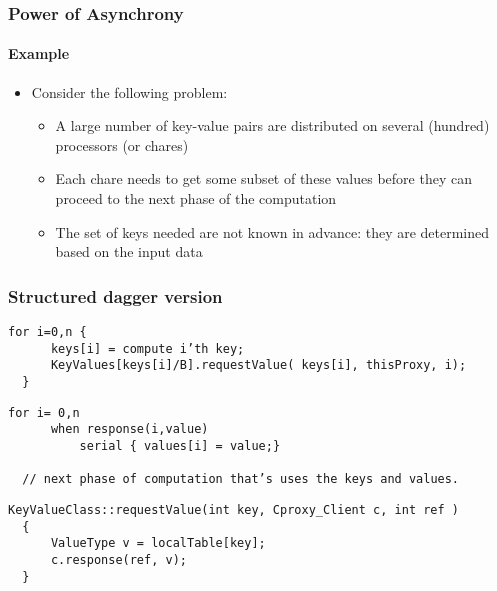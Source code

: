 \begin{frame}[fragile]

  \frametitle{Power of Asynchrony}
  \framesubtitle{Example}

  \begin{itemize}
    \item Consider the following problem:
    \begin{itemize}
      \item A large number of key-value pairs are distributed on several (hundred) processors  (or chares)
      \pause
      \item Each chare needs to get some subset of these values before they can proceed to the next phase of the computation
      \pause 
      \item The set of keys needed are not known in advance: they are determined based on the input data
    \end{itemize}
  \end{itemize}
\end{frame}

\begin{frame}[fragile]
  \frametitle{Structured dagger version}
  \begin{lstlisting}[basicstyle=\footnotesize]
  for i=0,n {
      keys[i] = compute i’th key;
      KeyValues[keys[i]/B].requestValue( keys[i], thisProxy, i); 
  }
  \end{lstlisting}
  \pause
  \begin{lstlisting}[basicstyle=\footnotesize]
  for i= 0,n 
      when response(i,value)
          serial { values[i] = value;}

  // next phase of computation that’s uses the keys and values.
  \end{lstlisting}
  \pause
  \begin{lstlisting}[basicstyle=\footnotesize]
  KeyValueClass::requestValue(int key, Cproxy_Client c, int ref )
  {  
      ValueType v = localTable[key];
      c.response(ref, v); 
  }
  \end{lstlisting}
\end{frame}

